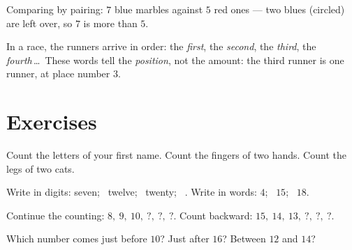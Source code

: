 \begin{omfigure}

{\small Comparing by pairing: $7$ blue marbles against $5$ red ones
--- two blues (circled) are left over, so $7$ is more than $5$.}
\end{omfigure}

\begin{example}\label{ex:g1:counting:ordinal}
In a race, the runners arrive in order: the \emph{first}, the
\emph{second}, the \emph{third}, the \emph{fourth}\,\dots\ These
words tell the \emph{position}, not the amount: the third runner is
one runner, at place number $3$.
\end{example}

\section{Exercises}

\begin{exercise}[$\star$]\label{exo:g1:counting:1}
Count the letters of your first name. Count the fingers of two
hands. Count the legs of two cats.
\end{exercise}

\begin{exercise}[$\star$]\label{exo:g1:counting:2}
Write in digits: seven; \ twelve; \ twenty; \ . Write in words:
$4$; \ $15$; \ $18$.
\end{exercise}

\begin{exercise}[$\star$]\label{exo:g1:counting:3}
Continue the counting: $8,\ 9,\ 10,\ ?,\ ?,\ ?$. Count backward:
$15,\ 14,\ 13,\ ?,\ ?,\ ?$.
\end{exercise}

\begin{exercise}[$\star$]\label{exo:g1:counting:4}
Which number comes just before $10$? Just after $16$? Between
$12$ and $14$?
\end{exercise}

